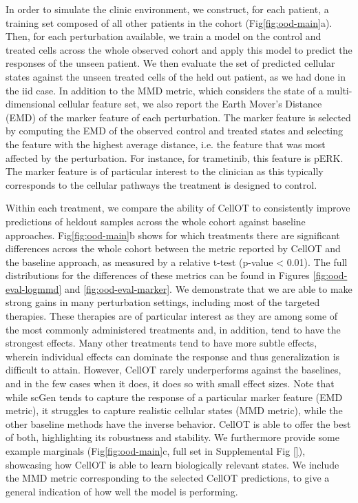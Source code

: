 In order to simulate the clinic environment, we construct, for each patient, a training set composed of all other patients in the cohort (Fig\ref{fig:ood-main}a).
Then, for each perturbation available,
we train a model on the control and treated cells across the whole observed cohort
and apply this model to predict the responses of the unseen patient.
We then evaluate the set of predicted cellular states against the unseen treated cells of the held out patient, as we had done in the iid case.
In addition to the MMD metric, which considers the state of a multi-dimensional cellular feature set,
we also report the Earth Mover’s Distance (EMD) of the marker feature of each perturbation.
The marker feature is selected by computing the EMD of the observed control and treated states and selecting the feature with the highest average distance,
i.e. the feature that was most affected by the perturbation.
For instance, for trametinib, this feature is pERK.
The marker feature is of particular interest to the clinician as this typically corresponds to the cellular pathways the treatment is designed to control.

Within each treatment, we compare the ability of CellOT to consistently improve predictions of heldout samples across the whole cohort against baseline approaches.
Fig\ref{fig:ood-main}b shows for which treatments there are significant differences across the whole cohort between
the metric reported by CellOT and the baseline approach, as measured by a relative t-test (p-value < 0.01).
The full distributions for the differences of these metrics can be found in Figures \ref{fig:ood-eval-logmmd} and \ref{fig:ood-eval-marker}.
We demonstrate that we are able to make strong gains in many perturbation settings, including most of the targeted therapies.
These therapies are of particular interest as they are among some of the most commonly administered treatments \cite{} and, in addition, tend to have the strongest effects.
Many other treatments tend to have more subtle effects, wherein individual effects can dominate the response and thus generalization is difficult to attain.
However, CellOT rarely underperforms against the baselines, and in the few cases when it does, it does so with small effect sizes.
Note that while scGen tends to capture the response of a particular marker feature (EMD metric), it struggles to capture realistic cellular states (MMD metric), while the other baseline methods have the inverse behavior.
CellOT is able to offer the best of both, highlighting its robustness and stability.
We furthermore provide some example marginals (Fig\ref{fig:ood-main}c, full set in Supplemental Fig \ref{}), showcasing how CellOT is able to learn biologically relevant states.
We include the MMD metric corresponding to the selected CellOT predictions, to give a general indication of how well the model is performing.

